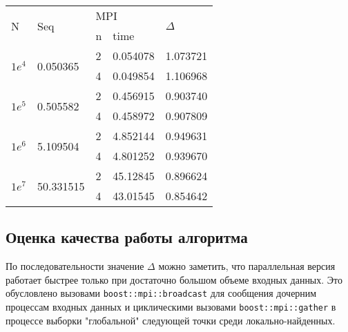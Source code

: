 \documentclass[12pt]{article}
\begin{document}
\begin{table}[]
\begin{tabular}{|l|l|ll|l|}
\hline
\multirow{2}{*}{N}      & \multirow{2}{*}{Seq}       & \multicolumn{2}{l|}{MPI}          & \multirow{2}{*}{$\Delta$} \\ \cline{3-4}
                        &                            & \multicolumn{1}{l|}{n} & time     &                           \\ \hline
\multirow{2}{*}{$1e^4$} & \multirow{2}{*}{0.050365}  & \multicolumn{1}{l|}{2} & 0.054078 & 1.073721                  \\ \cline{3-5} 
                        &                            & \multicolumn{1}{l|}{4} & 0.049854 & 1.106968                  \\ \hline
\multirow{2}{*}{$1e^5$} & \multirow{2}{*}{0.505582}  & \multicolumn{1}{l|}{2} & 0.456915 & 0.903740                  \\ \cline{3-5} 
                        &                            & \multicolumn{1}{l|}{4} & 0.458972 & 0.907809                  \\ \hline
\multirow{2}{*}{$1e^6$} & \multirow{2}{*}{5.109504}  & \multicolumn{1}{l|}{2} & 4.852144 & 0.949631                  \\ \cline{3-5} 
                        &                            & \multicolumn{1}{l|}{4} & 4.801252 & 0.939670                  \\ \hline
\multirow{2}{*}{$1e^7$} & \multirow{2}{*}{50.331515} & \multicolumn{1}{l|}{2} & 45.12845 & 0.896624                  \\ \cline{3-5} 
                        &                            & \multicolumn{1}{l|}{4} & 43.01545 & 0.854642                  \\ \hline
\end{tabular}
\end{table}

\subsection{Оценка качества работы алгоритма}
По последовательности значение $\Delta$ можно заметить, что параллельная версия работает быстрее только при достаточно большом объеме входных данных. Это обусловлено вызовами  \texttt{boost::mpi::broadcast} для сообщения дочерним процессам входных данных и циклическими вызовами \texttt{boost::mpi::gather} в процессе выборки "глобальной" следующей точки среди локально-найденных.
\end{document}
